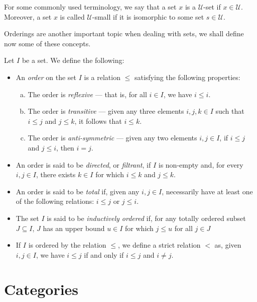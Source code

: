 For some commonly used terminology, we say that a set \(x\) is a \(\mathcal
U\)-set if \(x \in \mathcal U\). Moreover, a set \(x\) is called \(\mathcal
U\)-small if it is isomorphic to some set \(s \in \mathcal U\).

Orderings are another important topic when dealing with sets, we shall define
now some of these concepts.

\begin{definition}
\label{def:ordering-miscellaneous}
Let \(I\) be a set. We define the following:
\begin{itemize}\setlength\itemsep{0em}
\item An \emph{order} on the set \(I\) is a relation \(\leq\) satisfying the
  following properties:
  \begin{enumerate}[(a)]\setlength\itemsep{0em}
  \item The order is \emph{reflexive} --- that is, for all \(i \in I\), we have
    \(i \leq i\).
  \item The order is \emph{transitive} --- given any three elements \(i, j, k
    \in I\) such that \(i \leq j\) and \(j \leq k\), it follows that \(i \leq
    k\).
  \item The order is \emph{anti-symmetric} --- given any two elements \(i, j \in
    I\), if \(i \leq j\) and \(j \leq i\), then \(i = j\).
  \end{enumerate}
\item An order is said to be \emph{directed}, or \emph{filtrant}, if \(I\) is
  non-empty and, for every \(i, j \in I\), there exists \(k \in I\) for which
  \(i \leq k\) and \(j \leq k\).
\item An order is said to be \emph{total} if, given any \(i, j \in I\),
  necessarily have at least one of the following relations: \(i \leq j\) or \(j
  \leq i\).
\item The set \(I\) is said to be \emph{inductively ordered} if, for any totally
  ordered subset \(J \subseteq I\), \(J\) has an upper bound \(u \in I\) for
  which \(j \leq u\) for all \(j \in J\)
\item If \(I\) is ordered by the relation \(\leq\), we define a strict relation
  \(<\) as, given \(i, j \in I\), we have \(i \leq j\) if and only if \(i \leq
  j\) and \(i \neq j\).
\end{itemize}
\end{definition}

\section{Categories}

